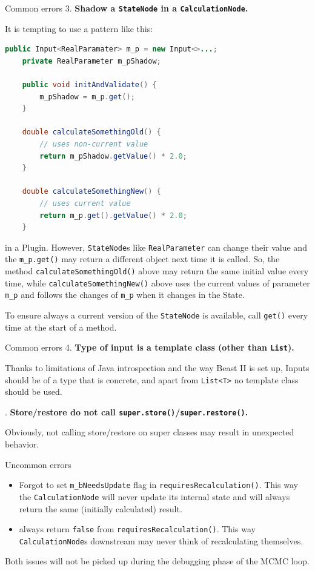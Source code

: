 \documentclass{beamer}
\theoremstyle{definition}
\begin{document}
\begin{frame}[containsverbatim]{Common errors}
3. {\bf\color{red} Shadow a {\tt StateNode} in a {\tt CalculationNode}.}

It is tempting to use a pattern like this:

\color{blue}\begin{lstlisting}[language=java]
public Input<RealParamater> m_p = new Input<>...;
    private RealParameter m_pShadow;

    public void initAndValidate() {
        m_pShadow = m_p.get();
    }
    
    double calculateSomethingOld() {
        // uses non-current value
        return m_pShadow.getValue() * 2.0;
    }

    double calculateSomethingNew() {
        // uses current value
        return m_p.get().getValue() * 2.0;
    }
\end{lstlisting}

\color{black}
in a Plugin. However, {\tt StateNode}s like {\tt RealParameter} can change their
value and the {\tt m\_p.get()} may return a different object next time it is called.
So, the method {\tt calculateSomethingOld()} above may return the same initial value
every time, while {\tt calculateSomethingNew()} above uses the current values of
parameter {\tt m\_p} and follows the changes of {\tt m\_p} when it changes in the State.

To ensure always a current version of the {\tt StateNode} is available, call
{\tt get()} every time at the start of a method.
\end{frame}

\begin{frame}{Common errors}
4. {\bf\color{red} Type of input is a template class (other than {\tt List}).}

Thanks to limitations of Java introspection and the way Beast II is set up, Inputs should be 
of a type that is concrete, and apart from {\tt List<T>} no template class should be used.\vskip1cm

. {\bf\color{red} Store/restore do not call {\tt super.store()}/{\tt super.restore()}.}

Obviously, not calling store/restore on super classes may result in unexpected behavior.

\end{frame}

\begin{frame}{Uncommon errors}
\begin{itemize}
\item Forgot to set {\tt m_bNeedsUpdate} flag in {\tt requiresRecalculation()}. This way
the {\tt CalculationNode} will never update its internal state and will always return the
same (initially calculated) result.
\item always return {\tt false} from {\tt requiresRecalculation()}. This way {\tt CalculationNode}s 
downstream may never think of recalculating themselves.
\end{itemize}
Both issues will not be picked up during the debugging phase
of the MCMC loop.

\end{frame}
\end{document}
